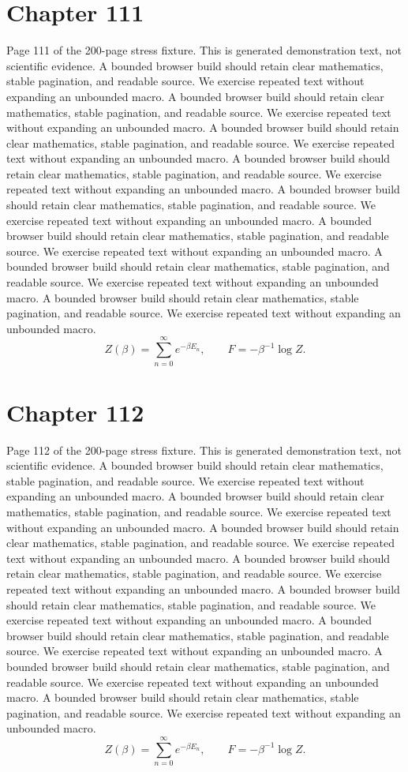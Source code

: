 \documentclass[11pt]{article}
\begin{document}
\section*{Chapter 111}
Page 111 of the 200-page stress fixture. This is generated demonstration text, not scientific evidence.
A bounded browser build should retain clear mathematics, stable pagination, and readable source. We exercise repeated text without expanding an unbounded macro.
A bounded browser build should retain clear mathematics, stable pagination, and readable source. We exercise repeated text without expanding an unbounded macro.
A bounded browser build should retain clear mathematics, stable pagination, and readable source. We exercise repeated text without expanding an unbounded macro.
A bounded browser build should retain clear mathematics, stable pagination, and readable source. We exercise repeated text without expanding an unbounded macro.
A bounded browser build should retain clear mathematics, stable pagination, and readable source. We exercise repeated text without expanding an unbounded macro.
A bounded browser build should retain clear mathematics, stable pagination, and readable source. We exercise repeated text without expanding an unbounded macro.
A bounded browser build should retain clear mathematics, stable pagination, and readable source. We exercise repeated text without expanding an unbounded macro.
A bounded browser build should retain clear mathematics, stable pagination, and readable source. We exercise repeated text without expanding an unbounded macro.
\[Z(\beta)=\sum_{n=0}^{\infty}e^{-\beta E_n},\qquad F=-\beta^{-1}\log Z.\]
\newpage
\section*{Chapter 112}
Page 112 of the 200-page stress fixture. This is generated demonstration text, not scientific evidence.
A bounded browser build should retain clear mathematics, stable pagination, and readable source. We exercise repeated text without expanding an unbounded macro.
A bounded browser build should retain clear mathematics, stable pagination, and readable source. We exercise repeated text without expanding an unbounded macro.
A bounded browser build should retain clear mathematics, stable pagination, and readable source. We exercise repeated text without expanding an unbounded macro.
A bounded browser build should retain clear mathematics, stable pagination, and readable source. We exercise repeated text without expanding an unbounded macro.
A bounded browser build should retain clear mathematics, stable pagination, and readable source. We exercise repeated text without expanding an unbounded macro.
A bounded browser build should retain clear mathematics, stable pagination, and readable source. We exercise repeated text without expanding an unbounded macro.
A bounded browser build should retain clear mathematics, stable pagination, and readable source. We exercise repeated text without expanding an unbounded macro.
A bounded browser build should retain clear mathematics, stable pagination, and readable source. We exercise repeated text without expanding an unbounded macro.
\[Z(\beta)=\sum_{n=0}^{\infty}e^{-\beta E_n},\qquad F=-\beta^{-1}\log Z.\]
\newpage
\end{document}
